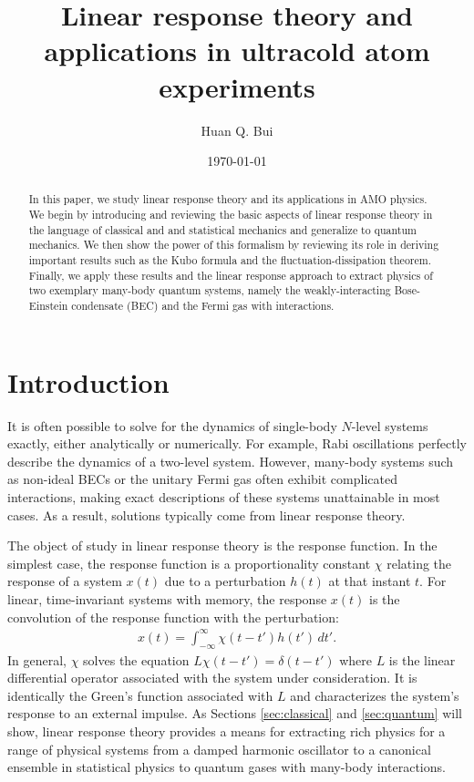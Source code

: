 \documentclass[reprint,
nofootinbib,
amsmath,amssymb,
aps]{revtex4-1}
\begin{document}
	
	

\title{Linear response theory and applications in ultracold atom experiments}
\author{Huan Q. Bui}
\date{\today}


\begin{abstract}
	In this paper, we study linear response theory and its applications in AMO physics. We begin by introducing and reviewing the basic aspects of linear response theory in the language of classical and and statistical mechanics and generalize to quantum mechanics. We then show the power of this formalism by reviewing its role in deriving important results such as the Kubo formula and the fluctuation-dissipation theorem. Finally, we apply these results and the linear response approach to extract physics of two exemplary many-body quantum systems, namely the weakly-interacting Bose-Einstein condensate (BEC) and the Fermi gas with interactions.
\end{abstract}

\maketitle


\section{Introduction}



It is often possible to solve for the dynamics of single-body $N$-level systems exactly, either analytically or numerically. For example, Rabi oscillations perfectly describe the dynamics of a two-level system. However, many-body systems such as non-ideal BECs or the unitary Fermi gas often exhibit complicated interactions, making exact descriptions of these systems unattainable in most cases. As a result, solutions typically come from linear response theory. 

The object of study in linear response theory is the response function. In the simplest case, the response function is a proportionality constant $\chi$ relating the response of a system $x(t)$ due to a perturbation $h(t)$ at that instant $t$. For linear, time-invariant systems with memory, the response $x(t)$ is the convolution of the response function with the perturbation:
\begin{align}\label{eq:linear_response}
x(t) = \int_{-\infty}^{\infty} \chi(t-t') h(t') \,dt'.
\end{align}
In general, $\chi$ solves the equation $ L \chi(t-t') = \delta(t-t')$ where $L$ is the linear differential operator associated with the system under consideration. It is identically the Green's function associated with $L$ and characterizes the system's response to an external impulse. As Sections \ref{sec:classical} and \ref{sec:quantum} will show, linear response theory provides a means for extracting rich physics for a range of physical systems from a damped harmonic oscillator to a canonical ensemble in statistical physics to quantum gases with many-body interactions. 
\end{document}
